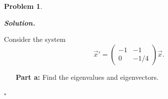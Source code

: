 \documentclass[12pt]{report}
\newtheorem{problem}{Problem}
\newenvironment{solution}[1][\it{Solution}]{\textbf{#1. } }{$\square$}
\begin{document}
\newpage



\begin{problem}
    
\end{problem}

\begin{solution}

    
    \noindent
    Consider the system
    \[ \vec{x}' = \begin{pmatrix}
        -1 & -1\\
        0 & -1/4
    \end{pmatrix}\vec{x}.\]
    \begin{enumerate}
        \item [{\bf Part a:}] Find the eigenvalues and eigenvectors.
        

\end{enumerate}
\end{solution}
\end{document}
